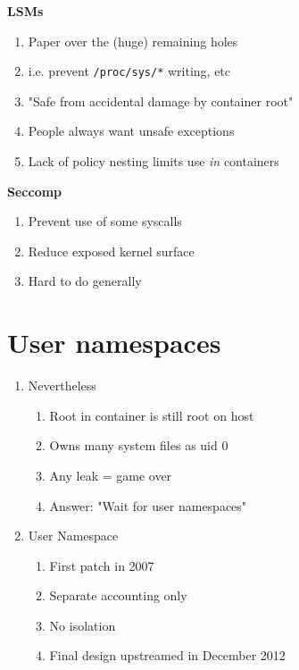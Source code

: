 \documentclass{beamer}
\begin{document}
\begin{frame}
\textbf{LSMs}
\begin{enumerate}
\item Paper over the (huge) remaining holes
\item i.e. prevent {\tt /proc/sys/*} writing, etc
\item "Safe from accidental damage by container root"
\item People always want unsafe exceptions
\item Lack of policy nesting limits use {\em in} containers
\end{enumerate}

\vspace{0.25in}

\textbf{Seccomp}
\begin{enumerate}
\item Prevent use of some syscalls
\item Reduce exposed kernel surface
\item Hard to do generally
\end{enumerate}
\end{frame}

\section{User namespaces}
\begin{frame}
\begin{enumerate}
\item Nevertheless
	\begin{enumerate}
	\item Root in container is still root on host
	\item Owns many system files as uid 0
	\item Any leak = game over
	\item Answer: "Wait for user namespaces"
	\end{enumerate}
\item User Namespace
	\begin{enumerate}
	\item First patch in 2007
	\item Separate accounting only
	\item No isolation
	\item Final design upstreamed in December 2012
	\end{enumerate}
\end{enumerate}
\end{frame}
\end{document}
